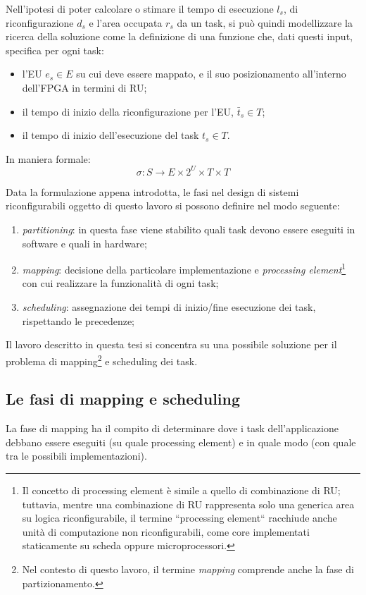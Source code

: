Nell'ipotesi di poter calcolare o stimare il tempo di esecuzione $l_{s}$, di 
riconfigurazione $d_{s}$ e l'area occupata $r_{s}$ da un task, si può quindi modellizzare 
la ricerca della soluzione come la definizione di una funzione 
che, dati questi input, specifica per ogni task:
\begin{itemize}
 \item l'\ac{EU} $e_s \in E$ su cui deve essere mappato, e il suo posizionamento 
all'interno dell'\ac{FPGA} in termini di \ac{RU};
 \item il tempo di inizio della riconfigurazione per l'\ac{EU}, $\bar{t}_s \in T$;
 \item il tempo di inizio dell'esecuzione del task $t_s \in T$.
\end{itemize}

In maniera formale:
\begin{equation}
\label{formula:mappingScheduling}
 \sigma : S \rightarrow E \times 2^{U} \times T \times T
\end{equation}

Data la formulazione appena introdotta, le fasi nel design di sistemi riconfigurabili
oggetto di questo lavoro si possono definire nel modo seguente:
\begin{enumerate}
 \item \emph{partitioning}: in questa fase viene stabilito quali task devono essere
 eseguiti in software e quali in hardware;
 \item \emph{mapping}: decisione della particolare implementazione e \emph{processing
 element}\footnote{Il concetto di processing element è simile a quello di combinazione
 di \ac{RU}; tuttavia, mentre una combinazione di \ac{RU} rappresenta solo una generica
 area su logica riconfigurabile, il termine ``processing element`` racchiude anche unità
 di computazione non riconfigurabili, come core implementati staticamente su scheda oppure
 microprocessori.}
 con cui realizzare la funzionalità di ogni task;
 \item \emph{scheduling}: assegnazione dei tempi di inizio/fine esecuzione dei task,
 rispettando le precedenze;
\end{enumerate}
Il lavoro descritto in questa tesi si concentra su una possibile soluzione per il 
problema di mapping\footnote{Nel contesto di questo lavoro, il termine \emph{mapping}
comprende anche la fase di partizionamento.} e scheduling dei task.


\subsection{Le fasi di mapping e scheduling}
\label{subsec:mappingScheduling}
La fase di mapping ha il
compito di determinare dove i task dell'applicazione debbano essere eseguiti
(su quale processing element) e in quale modo (con quale tra le possibili implementazioni).


